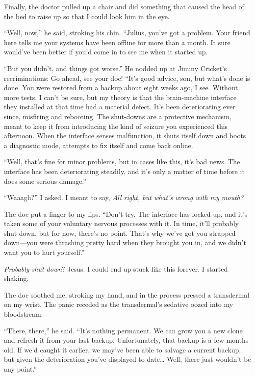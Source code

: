 Finally, the doctor pulled up a chair and did something that caused
the head of the bed to raise up so that I could look him in the
eye.

“Well, now,” he said, stroking his chin. “Julius, you've got a
problem. Your friend here tells me your systems have been offline
for more than a month. It sure would've been better if you'd come
in to see me when it started up.

“But you didn't, and things got worse.” He nodded up at Jiminy
Cricket's recriminations: Go ahead, see your doc! “It's good
advice, son, but what's done is done. You were restored from a
backup about eight weeks ago, I see. Without more tests, I can't be
sure, but my theory is that the brain-machine interface they
installed at that time had a material defect. It's been
deteriorating ever since, misfiring and rebooting. The shut-downs
are a protective mechanism, meant to keep it from introducing the
kind of seizure you experienced this afternoon. When the interface
senses malfunction, it shuts itself down and boots a diagnostic
mode, attempts to fix itself and come back online.

“Well, that's fine for minor problems, but in cases like this, it's
bad news. The interface has been deteriorating steadily, and it's
only a matter of time before it does some serious damage.”

“Waaagh?” I asked. I meant to say,
\emph{All right, but what's wrong with my mouth?}

The doc put a finger to my lips. “Don't try. The interface has
locked up, and it's taken some of your voluntary nervous processes
with it. In time, it'll probably shut down, but for now, there's no
point. That's why we've got you strapped down—you were thrashing
pretty hard when they brought you in, and we didn't want you to
hurt yourself.”

\emph{Probably shut down}? Jesus. I could end up stuck like this
forever. I started shaking.

The doc soothed me, stroking my hand, and in the process pressed a
transdermal on my wrist. The panic receded as the transdermal's
sedative oozed into my bloodstream.

“There, there,” he said. “It's nothing permanent. We can grow you a
new clone and refresh it from your last backup. Unfortunately, that
backup is a few months old. If we'd caught it earlier, we may've
been able to salvage a current backup, but given the deterioration
you've displayed to date… Well, there just wouldn't be any point.”

